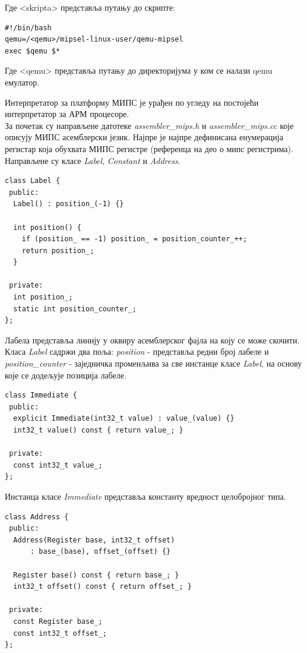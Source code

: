 \documentclass[12pt,oneside]{memoir}
\begin{document}
Где <skripta> представља путању до скрипте:\\

\begin{verbatim}
#!/bin/bash
qemu=/<qemu>/mipsel-linux-user/qemu-mipsel
exec $qemu $*
\end{verbatim}
Где <qemu> представља путању до директоријума у ком се налази qemu емулатор.

Интерпретатор за платформу МИПС је урађен по угледу на постојећи интерпретатор за АРМ процесоре.\\
За почетак су направљене датотеке \textit{assembler\_mips.h} и \textit{assembler\_mips.cc} које описују МИПС асемблерски језик. Најпре је најпре дефинисана енумерација регистар која обухвата  МИПС регистре (референца на део о мипс регистрима). Направљене су класе \textit{Label}, \textit{Constant} и \textit{Address}. \\

\begin{verbatim}
class Label {
 public:
  Label() : position_(-1) {}

  int position() {
    if (position_ == -1) position_ = position_counter_++;
    return position_;
  }

 private:
  int position_;
  static int position_counter_;
}; 
\end{verbatim}

Лабела представља линију у оквиру асемблерског фајла на коју се може скочити. Класа \textit{Label} садржи два поља: \textit{position} - представља редни број лабеле и \textit{position\_counter} - заједничка променљива за све инстанце класе \textit{Label}, на основу које се додељује позиција лабеле.\\

\begin{verbatim}
class Immediate {
 public:
  explicit Immediate(int32_t value) : value_(value) {}
  int32_t value() const { return value_; }

 private:
  const int32_t value_;
};
\end{verbatim}

Инстанца класе \textit{Immediate} представља константу вредност целобројног типа.\\

\begin{verbatim}
class Address {
 public:
  Address(Register base, int32_t offset)
      : base_(base), offset_(offset) {}

  Register base() const { return base_; }
  int32_t offset() const { return offset_; }

 private:
  const Register base_;
  const int32_t offset_;
};
\end{verbatim}
\end{document}
